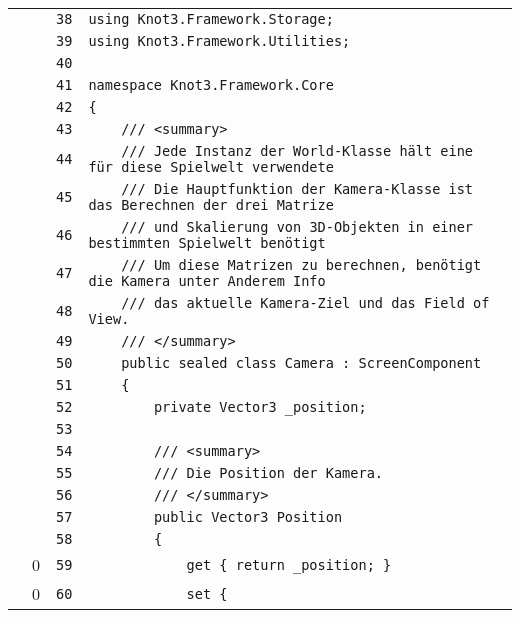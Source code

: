 \documentclass[a4paper,10pt]{article}
\begin{document}
\begin{longtable}[l]{lrrl}
\cellcolor{gray} &  & \verb~38~ & \verb~using Knot3.Framework.Storage;~\\
\cellcolor{gray} &  & \verb~39~ & \verb~using Knot3.Framework.Utilities;~\\
\cellcolor{gray} &  & \verb~40~ & \verb~~\\
\cellcolor{gray} &  & \verb~41~ & \verb~namespace Knot3.Framework.Core~\\
\cellcolor{gray} &  & \verb~42~ & \verb~{~\\
\cellcolor{gray} &  & \verb~43~ & \verb~    /// <summary>~\\
\cellcolor{gray} &  & \verb~44~ & \verb~    /// Jede Instanz der World-Klasse hält eine für diese Spielwelt verwendete~\\
\cellcolor{gray} &  & \verb~45~ & \verb~    /// Die Hauptfunktion der Kamera-Klasse ist das Berechnen der drei Matrize~\\
\cellcolor{gray} &  & \verb~46~ & \verb~    /// und Skalierung von 3D-Objekten in einer bestimmten Spielwelt benötigt ~\\
\cellcolor{gray} &  & \verb~47~ & \verb~    /// Um diese Matrizen zu berechnen, benötigt die Kamera unter Anderem Info~\\
\cellcolor{gray} &  & \verb~48~ & \verb~    /// das aktuelle Kamera-Ziel und das Field of View.~\\
\cellcolor{gray} &  & \verb~49~ & \verb~    /// </summary>~\\
\cellcolor{gray} &  & \verb~50~ & \verb~    public sealed class Camera : ScreenComponent~\\
\cellcolor{gray} &  & \verb~51~ & \verb~    {~\\
\cellcolor{gray} &  & \verb~52~ & \verb~        private Vector3 _position;~\\
\cellcolor{gray} &  & \verb~53~ & \verb~~\\
\cellcolor{gray} &  & \verb~54~ & \verb~        /// <summary>~\\
\cellcolor{gray} &  & \verb~55~ & \verb~        /// Die Position der Kamera.~\\
\cellcolor{gray} &  & \verb~56~ & \verb~        /// </summary>~\\
\cellcolor{gray} &  & \verb~57~ & \verb~        public Vector3 Position~\\
\cellcolor{gray} &  & \verb~58~ & \verb~        {~\\
\cellcolor{red} & 0 & \verb~59~ & \verb~            get { return _position; }~\\
\cellcolor{red} & 0 & \verb~60~ & \verb~            set {~\\

\end{longtable}
\end{document}
